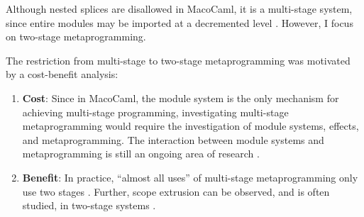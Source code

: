 \begin{enumerate}
  Although nested splices are disallowed in MacoCaml, it is a multi-stage system, since entire modules may be imported at a decremented level \citep{xie-2023}. However, I focus on two-stage metaprogramming. 
\end{enumerate}
  
The restriction from multi-stage to two-stage metaprogramming was motivated by a cost-benefit analysis:
\begin{enumerate}
  \item \textbf{Cost}: Since in MacoCaml, the module system is the only mechanism for achieving multi-stage programming, investigating multi-stage metaprogramming would require the investigation of module systems, effects, and metaprogramming. The interaction between module systems and metaprogramming is still an ongoing area of research \citep{chiang-2024}.
  \item \textbf{Benefit}: In practice, ``almost all uses'' of multi-stage metaprogramming only use two stages \citep{inoue-2012}. Further, scope extrusion can be observed, and is often studied, in two-stage systems \citep{isoda-24,kiselyov-16}.
\end{enumerate}